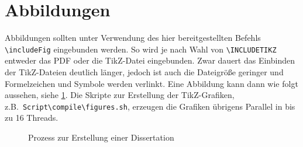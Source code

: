 \blindtext[3]


\section{Abbildungen}
\label{sec:abbildungen}

Abbildungen sollten unter Verwendung des hier bereitgestellten Befehls \texttt{\textbackslash includeFig} eingebunden werden. So wird je nach Wahl von \texttt{\textbackslash INCLUDETIKZ} entweder das PDF oder die TikZ-Datei eingebunden. Zwar dauert das Einbinden der TikZ-Dateien deutlich länger, jedoch ist auch die Dateigröße geringer und Formelzeichen und Symbole werden verlinkt. Eine Abbildung kann dann wie folgt aussehen, siehe \cref{img:Dissertationsprozess}. Die Skripte zur Erstellung der TikZ-Grafiken, z.B.\ \texttt{Script\textbackslash{}compile\textbackslash{}figures.sh}, erzeugen die Grafiken übrigens Parallel in bis zu 16 Threads.

\blindtext[5]

\begin{figure}[hbt]
	\centering
	\caption{Prozess zur Erstellung einer Dissertation}
	\label{img:Dissertationsprozess}
\end{figure}

\blindtext[20]
